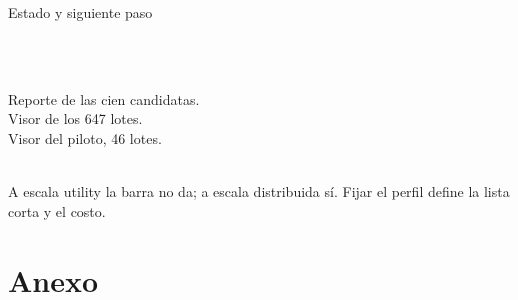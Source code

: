 \documentclass[aspectratio=169, 11pt]{beamer}
\begin{document}
\begin{frame}{Estado y siguiente paso}
  \vspace{0.1em}
  \hspace{0.01\textwidth}\begin{minipage}{0.96\textwidth}
    \filete\\[0.25em]
    \begin{minipage}[t]{0.47\linewidth}
      \raggedright
      \\[0.5em]{\footnotesize\textcolor{tinta2}{Reporte de las cien candidatas.\\[0.25em]
      Visor de los 647 lotes.\\[0.25em]
      Visor del piloto, 46 lotes.}}
    \end{minipage}\hfill
    \begin{minipage}[t]{0.47\linewidth}
      \raggedright
      \\[0.5em]{\footnotesize\textcolor{tinta2}{A escala utility la barra no da; a escala
      distribuida sí. Fijar el perfil define la lista corta y el costo.}}
    \end{minipage}
  \end{minipage}
\end{frame}

\section{Anexo}
\end{document}

